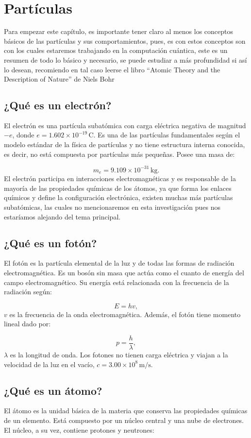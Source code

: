 \newpage
\section{Partículas}
\noindent 
Para empezar este capítulo, es importante tener claro al menos los conceptos básicos de las partículas y sus comportamientos, pues, es con estos conceptos son con los cuales estaremos trabajando en la computación cuántica, este es un resumen de todo lo básico y necesario, se puede estudiar a más profundidad si así lo desean, recomiendo en tal caso leerse el libro “Atomic Theory and the Description of Nature” de Niels Bohr
\subsection*{¿Qué es un electrón?}
\noindent 
El electrón es una partícula subatómica con carga eléctrica negativa de magnitud $-e$, donde $e = 1.602 \times 10^{-19} \, \text{C}$. Es una de las partículas fundamentales según el modelo estándar de la física de partículas y no tiene estructura interna conocida, es decir, no está compuesta por partículas más pequeñas. Posee una masa de:

\[
m_e = 9.109 \times 10^{-31} \, \text{kg}.
\]
\noindent 
El electrón participa en interacciones electromagnéticas y es responsable de la mayoría de las propiedades químicas de los átomos, ya que forma los enlaces químicos y define la configuración electrónica, existen muchas más partículas subatómicas, las cuales no mencionaremos en esta investigación pues nos estaríamos alejando del tema principal.

\subsection*{¿Qué es un fotón?}
\noindent 
El fotón es la partícula elemental de la luz y de todas las formas de radiación electromagnética. Es un bosón sin masa que actúa como el cuanto de energía del campo electromagnético. Su energía está relacionada con la frecuencia de la radiación según:

\[
E = h v,
\]
\noindent 
$v$ es la frecuencia de la onda electromagnética. Además, el fotón tiene momento lineal dado por:

\[
p = \frac{h}{\lambda},
\]
\noindent 
$\lambda$ es la longitud de onda. Los fotones no tienen carga eléctrica y viajan a la velocidad de la luz en el vacío, $c = 3.00 \times 10^8 \, \text{m/s}$.

\subsection*{¿Qué es un átomo?}
\noindent 
El átomo es la unidad básica de la materia que conserva las propiedades químicas de un elemento. Está compuesto por un núcleo central y una nube de electrones. El núcleo, a su vez, contiene protones y neutrones:


